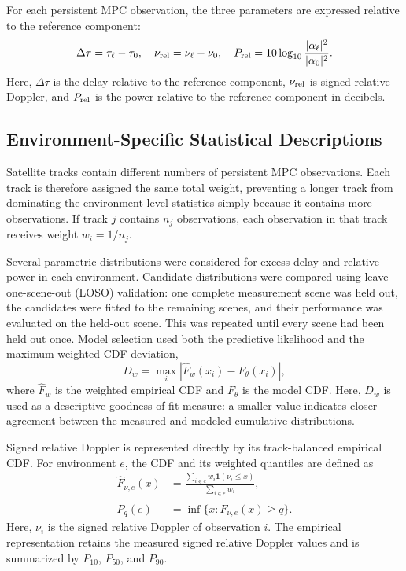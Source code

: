\documentclass[conference]{IEEEtran}
\begin{document}
For each persistent MPC observation, the three parameters are expressed relative to the reference component:
\begin{equation}
\Delta\tau=\tau_{\ell}-\tau_{0},\quad
\nu_{\rm rel}=\nu_{\ell}-\nu_{0},\quad
P_{\rm rel}=10\log_{10}\frac{|\alpha_{\ell}|^2}{|\alpha_{0}|^2}.
\label{eq:parameters}
\end{equation}
Here, $\Delta\tau$ is the delay relative to the reference component, $\nu_{\rm rel}$ is signed relative Doppler, and $P_{\rm rel}$ is the power relative to the reference component in decibels.

\subsection{Environment-Specific Statistical Descriptions}
Satellite tracks contain different numbers of persistent MPC observations. Each track is therefore assigned the same total weight, preventing a longer track from dominating the environment-level statistics simply because it contains more observations. If track $j$ contains $n_j$ observations, each observation in that track receives weight $w_i=1/n_j$.

Several parametric distributions were considered for excess delay and relative power in each environment. Candidate distributions were compared using leave-one-scene-out (LOSO) validation: one complete measurement scene was held out, the candidates were fitted to the remaining scenes, and their performance was evaluated on the held-out scene. This was repeated until every scene had been held out once. Model selection used both the predictive likelihood and the maximum weighted CDF deviation,
\begin{equation}
D_w=\max_i\left|\widehat F_w(x_i)-F_\theta(x_i)\right|,
\label{eq:cdf-distance}
\end{equation}
where $\widehat F_w$ is the weighted empirical CDF and $F_\theta$ is the model CDF. Here, $D_w$ is used as a descriptive goodness-of-fit measure: a smaller value indicates closer agreement between the measured and modeled cumulative distributions.

Signed relative Doppler is represented directly by its track-balanced empirical CDF. For environment $e$, the CDF and its weighted quantiles are defined as
\begin{equation}
\begin{aligned}
\widehat F_{\nu,e}(x)
&=\frac{\sum_{i\in e}w_i\mathbf{1}(\nu_i\le x)}
{\sum_{i\in e}w_i},\\
P_q(e)&=\inf\{x:\widehat F_{\nu,e}(x)\ge q\}.
\end{aligned}
\label{eq:doppler-ecdf}
\end{equation}
Here, $\nu_i$ is the signed relative Doppler of observation $i$. The empirical representation retains the measured signed relative Doppler values and is summarized by $P_{10}$, $P_{50}$, and $P_{90}$.
\end{document}
